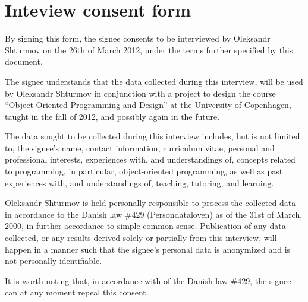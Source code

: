 \section*{Inteview consent form}

\renewcommand{\staticDate}{March 26th 2012}

By signing this form, the signee consents to be interviewed by Oleksandr
Shturmov on the 26th of March 2012, under the terms further specified by this
document.

The signee understands that the data collected during this interview, will
be used by Oleksandr Shturmov in conjunction with a project to design the
course ``Object-Oriented Programming and Design'' at the University of
Copenhagen, taught in the fall of 2012, and possibly again in the future. 

The data sought to be collected during this interview includes, but is not
limited to, the signee's name, contact information, curriculum vitae,
personal and professional interests, experiences with, and understandings of,
concepts related to programming, in particular, object-oriented programming, as
well as past experiences with, and understandings of, teaching, tutoring, and
learning. 

Oleksandr Shturmov is held personally responsible to process the collected data
in accordance to the Danish law \#429 (Persondataloven) as of the 31st of
March, 2000, in further accordance to simple common sense. Publication of any
data collected, or any results derived solely or partially from this interview,
will happen in a manner such that the signee's personal data is anonymized and
is not personally identifiable.

It is worth noting that, in accordance with  of the Danish law
\#429, the signee can at any moment repeal this consent.
